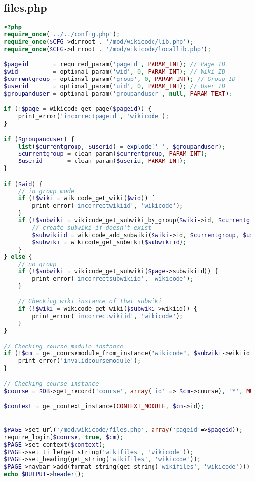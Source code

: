 \subsection{files.php}
\begin{lstlisting}[language=PHP]
<?php
require_once('../../config.php');
require_once($CFG->dirroot . '/mod/wikicode/lib.php');
require_once($CFG->dirroot . '/mod/wikicode/locallib.php');

$pageid       = required_param('pageid', PARAM_INT); // Page ID
$wid          = optional_param('wid', 0, PARAM_INT); // Wiki ID
$currentgroup = optional_param('group', 0, PARAM_INT); // Group ID
$userid       = optional_param('uid', 0, PARAM_INT); // User ID
$groupanduser = optional_param('groupanduser', null, PARAM_TEXT);

if (!$page = wikicode_get_page($pageid)) {
    print_error('incorrectpageid', 'wikicode');
}

if ($groupanduser) {
    list($currentgroup, $userid) = explode('-', $groupanduser);
    $currentgroup = clean_param($currentgroup, PARAM_INT);
    $userid       = clean_param($userid, PARAM_INT);
}

if ($wid) {
    // in group mode
    if (!$wiki = wikicode_get_wiki($wid)) {
        print_error('incorrectwikiid', 'wikicode');
    }
    if (!$subwiki = wikicode_get_subwiki_by_group($wiki->id, $currentgroup, $userid)) {
        // create subwiki if doesn't exist
        $subwikiid = wikicode_add_subwiki($wiki->id, $currentgroup, $userid);
        $subwiki = wikicode_get_subwiki($subwikiid);
    }
} else {
    // no group
    if (!$subwiki = wikicode_get_subwiki($page->subwikiid)) {
        print_error('incorrectsubwikiid', 'wikicode');
    }

    // Checking wiki instance of that subwiki
    if (!$wiki = wikicode_get_wiki($subwiki->wikiid)) {
        print_error('incorrectwikiid', 'wikicode');
    }
}

// Checking course module instance
if (!$cm = get_coursemodule_from_instance("wikicode", $subwiki->wikiid)) {
    print_error('invalidcoursemodule');
}

// Checking course instance
$course = $DB->get_record('course', array('id' => $cm->course), '*', MUST_EXIST);

$context = get_context_instance(CONTEXT_MODULE, $cm->id);


$PAGE->set_url('/mod/wikicode/files.php', array('pageid'=>$pageid));
require_login($course, true, $cm);
$PAGE->set_context($context);
$PAGE->set_title(get_string('wikifiles', 'wikicode'));
$PAGE->set_heading(get_string('wikifiles', 'wikicode'));
$PAGE->navbar->add(format_string(get_string('wikifiles', 'wikicode')));
echo $OUTPUT->header();


\end{lstlisting}
